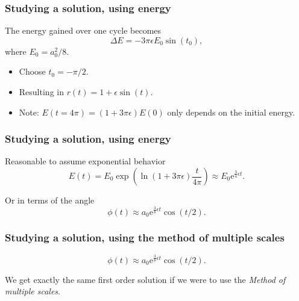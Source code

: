 \documentclass[swedish, english]{beamer}
\newcommand{\ee}{\mathrm{e}}
\begin{document}
\begin{frame}
\frametitle{Studying a solution, using energy}
The energy gained over one cycle becomes
\[
\Delta{E}=-3\pi\epsilon E_0\sin(t_0),
\]
where $E_0=a_0^2/8$.
\vspace{6pt}

\begin{itemize}
\item Choose $t_0=-\pi/2$.
\item Resulting in $r(t)=1+\epsilon\sin(t)$.
\end{itemize}

\begin{itemize}
\item Note: $E(t=4\pi)=(1+3\pi\epsilon)E(0)$ only depends on the
initial energy.
\end{itemize}
\end{frame}


\begin{frame}
\frametitle{Studying a solution, using energy}
Reasonable to assume exponential behavior
\[
E(t)=E_0\exp(\ln(1+3\pi\epsilon)\frac{t}{4\pi})
\approx E_0\ee^{\frac{3}{4}\epsilon t}.
\]

Or in terms of the angle
\[
\phi(t)\approx a_0\ee^{\frac{3}{8}\epsilon t}
\cos(t/2).
\]
\end{frame}

\begin{frame}
\frametitle{Studying a solution, using the method of multiple scales}
\[
\phi(t)\approx a_0\ee^{\frac{3}{8}\epsilon t}
\cos(t/2).
\]
\vspace{16pt}

We get exactly the same first order solution if we were to use the
\emph{Method of multiple scales}.


\end{frame}



\end{document}
